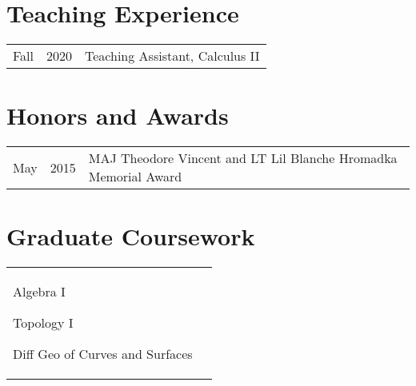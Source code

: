 \documentclass[margin,line,pifont,palatino,courier]{res}
\newenvironment{list1}{
  \begin{list}{\ding{113}}{%
      \setlength{\itemsep}{0in}
      \setlength{\parsep}{0in} \setlength{\parskip}{0in}
      \setlength{\topsep}{0in} \setlength{\partopsep}{0in}
      \setlength{\leftmargin}{0.17in}}}{\end{list}}
\begin{document}
\begin{resume}


\section{\sc Teaching Experience}

\begin{tabular}{@{}p{0.4in}p{0.3in}p{4in}}
Fall & 2020 & Teaching Assistant, Calculus II\\
\end{tabular}



\section{\sc Honors and Awards}

\begin{tabular}{@{}p{0.4in}p{0.3in}p{4in}}
May & 2015 & MAJ Theodore Vincent and LT Lil Blanche Hromadka Memorial Award\\
\end{tabular}







\section{\sc Graduate Coursework}

\begin{tabular}{@{}p{2.3in}p{3in}}
\begin{list1}
\item Algebra I
\item Topology I
\item Diff Geo of Curves and Surfaces


\end{list1}
\end{tabular}
\end{resume}
\end{document}
